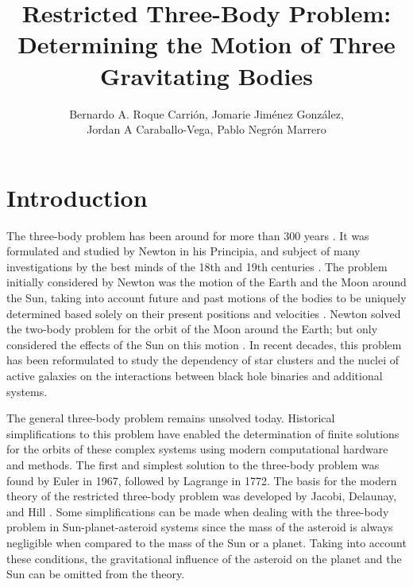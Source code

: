 \documentclass{article}
\begin{document}
\title{Restricted Three-Body Problem: Determining the Motion of Three Gravitating Bodies}
\author{Bernardo A. Roque Carri\'{o}n, Jomarie Jim\'{e}nez Gonz\'{a}lez, 

Jordan A Caraballo-Vega, Pablo Negr\'{o}n Marrero}
\maketitle %
\section{Introduction}

The three-body problem has been around for more than 300 years \cite{Musielak}. It was formulated and studied by Newton in his Principia, and subject of many investigations by the best minds of the 18th and 19th centuries \cite{Frank}. The problem initially considered by Newton was the motion of the Earth and the Moon around the Sun, taking into account future and past motions of the bodies to be uniquely determined based solely on their present positions and velocities \cite{Frank}. Newton solved the two-body problem for the orbit of the Moon around the Earth; but only considered the effects of the Sun on this motion \cite{Musielak}. In recent decades, this problem has been reformulated to study the dependency of star clusters and the nuclei of active galaxies on the interactions between black hole binaries and additional systems. 

The general three-body problem remains unsolved today. Historical simplifications to this problem have enabled the determination of finite solutions for the orbits of these complex systems using modern computational hardware and methods. The first and simplest solution to the three-body problem was found by Euler in 1967, followed by Lagrange in 1772. The basis for the modern theory of the restricted three-body problem was developed by Jacobi, Delaunay, and Hill \cite{Frank}. Some simplifications can be made when dealing with the three-body problem in Sun-planet-asteroid systems since the mass of the asteroid is always negligible when compared to the mass of the Sun or a planet. Taking into account these conditions, the gravitational influence of the asteroid on the planet and the Sun can be omitted from the theory.
\end{document}
